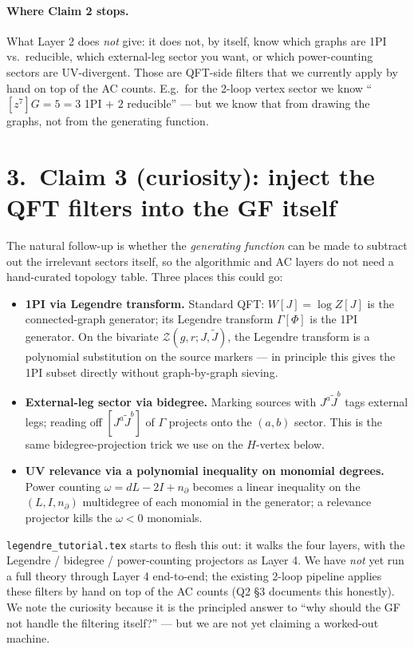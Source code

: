\documentclass[11pt,a4paper]{article}
\begin{document}
\paragraph{Where Claim 2 stops.}
What Layer 2 does \emph{not} give: it does not, by itself, know which graphs
are 1PI vs.\ reducible, which external-leg sector you want, or which power-counting
sectors are UV-divergent.  Those are QFT-side filters that we currently apply by
hand on top of the AC counts.  E.g.\ for the 2-loop vertex sector we know
``$[z^7]G = 5 = 3$ 1PI $+$ $2$ reducible'' --- but we know that from drawing the
graphs, not from the generating function.

\section*{3.\ Claim 3 (curiosity): inject the QFT filters into the GF itself}

The natural follow-up is whether the \emph{generating function} can be made
to subtract out the irrelevant sectors itself, so the algorithmic and AC
layers do not need a hand-curated topology table.  Three places this could go:
\begin{itemize}[leftmargin=2em,itemsep=2pt]
  \item \textbf{1PI via Legendre transform.}  Standard QFT: $W[J] = \log Z[J]$
        is the connected-graph generator; its Legendre transform $\Gamma[\Phi]$
        is the 1PI generator.  On the bivariate $\mathcal{Z}(g,r;J,\tilde J)$,
        the Legendre transform is a polynomial substitution on the source
        markers --- in principle this gives the 1PI subset directly without
        graph-by-graph sieving.
  \item \textbf{External-leg sector via bidegree.}  Marking sources with
        $J^a \tilde J^b$ tags external legs; reading off $[J^a \tilde J^b]$ of
        $\Gamma$ projects onto the $(a,b)$ sector.  This is the same
        bidegree-projection trick we use on the $H$-vertex below.
  \item \textbf{UV relevance via a polynomial inequality on monomial degrees.}
        Power counting $\omega = dL - 2I + n_\partial$ becomes a linear
        inequality on the $(L, I, n_\partial)$ multidegree of each monomial in
        the generator; a relevance projector kills the $\omega < 0$ monomials.
\end{itemize}
\texttt{legendre\_tutorial.tex} starts to flesh this out: it walks the four
layers, with the Legendre / bidegree / power-counting projectors as Layer 4.
We have \emph{not} yet run a full theory through Layer 4 end-to-end; the
existing 2-loop pipeline applies these filters by hand on top of the
AC counts (Q2 \S 3 documents this honestly).  We note the curiosity
because it is the principled answer to ``why should the GF not handle the
filtering itself?''  --- but we are not yet claiming a worked-out machine.
\end{document}
